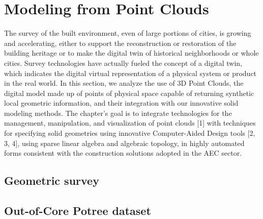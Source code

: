 \chapter{Modeling from Point Clouds}\label{chapt:11}

The survey of the built environment, even of large portions of cities, is growing and accelerating, either to support the reconstruction or restoration of the building heritage or to make the digital twin of historical neighborhoods or whole cities.
Survey technologies have actually fueled the concept of a digital twin, which indicates the digital virtual representation of a physical system or product in the real world.
In this section, we analyze the use of 3D Point Clouds, the digital model made up of points of physical space capable of returning synthetic local geometric information, and their integration with our innovative solid modeling methods.
The chapter's goal is to integrate technologies for the management, manipulation, and visualization of point clouds [1] with techniques for specifying solid geometries using innovative Computer-Aided Design tools [2, 3, 4], using sparse linear algebra and algebraic topology, in highly automated forms consistent with the construction solutions adopted in the AEC sector.



\section{ Geometric survey}\label{sect:11-1}



\section{ Out-of-Core Potree dataset}\label{sect:11-2}




